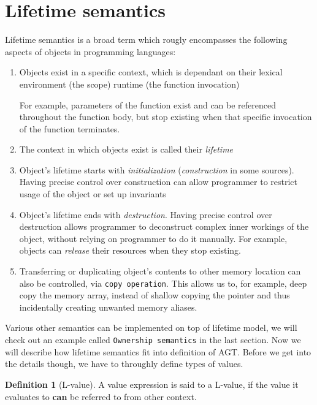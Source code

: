 \documentclass[times, utf8, diplomski]{fer}
\theoremstyle{definition}
\newtheorem{definition}{Definition}[]
\begin{document}
\section{Lifetime semantics}

Lifetime semantics is a broad term which rougly encompasses the following aspects of objects
in programming languages:

\begin{enumerate}
    \item Objects exist in a specific context, which is dependant on their 
        \subitem lexical environment (the scope)
        \subitem runtime (the function invocation)

        For example, parameters of the function exist and can be referenced throughout the function body,
        but stop existing when that specific invocation of the function terminates. 

    \item The context in which objects exist is called their \textit{lifetime}
    \item Object's lifetime starts with \textit{initialization} (\textit{construction} in some sources).
        \subitem Having precise control over construction can allow programmer
                to restrict usage of the object or set up invariants
    \item Object's lifetime ends with \textit{destruction}.
        Having precise control over destruction allows programmer to
        deconstruct complex inner workings of the object, without relying on programmer to do it manually.
        For example, objects can \textit{release} their resources when they stop existing.
    \item Transferring or duplicating object's contents to other memory location can also be controlled,
        via \texttt{copy operation}. This allows us to, for example, deep copy the memory array, 
        instead of shallow copying the pointer and thus incidentally creating unwanted memory aliases.
\end{enumerate}

Various other semantics can be implemented on top of lifetime model, we will check out an example called
\texttt{Ownership semantics} in the last section. Now we will describe how lifetime semantics fit into
definition of AGT. Before we get into the details though, we have to throughly define types of values.

\begin{definition}[L-value]
A value expression is said to a L-value, 
if the value it evaluates to \textbf{can} be referred to from other context.
\end{definition}
\end{document}
